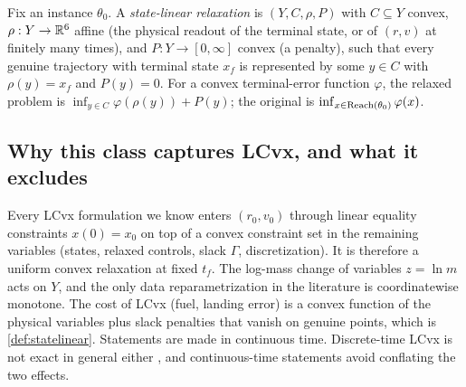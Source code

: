 \begin{definition}\label{def:statelinear}
Fix an instance $\theta_0$. A \emph{state-linear relaxation} is $(Y,C,\rho,P)$ with $C\subseteq Y$ convex,
$\rho:Y\to\mathbb{R}^6$ affine (the physical readout of the terminal state, or of $(r,v)$ at finitely many times), and
$P:Y\to[0,\infty]$ convex (a penalty), such that every genuine trajectory with terminal state $x_f$ is represented by
some $y\in C$ with $\rho(y)=x_f$ and $P(y)=0$. For a convex terminal-error function $\varphi$, the relaxed problem is
$\inf_{y\in C}\varphi(\rho(y))+P(y)$; the original is $\inf_{x\in\mathrm{Reach}(\theta_0)}\varphi(x)$.
\end{definition}

\subsection{Why this class captures LCvx, and what it excludes}\label{sec:scope}
Every LCvx formulation we know enters $(r_0,v_0)$ through linear equality constraints $x(0)=x_0$ on top of a convex
constraint set in the remaining variables (states, relaxed controls, slack $\Gamma$, discretization). It is therefore a
uniform convex relaxation at fixed $t_f$. The log-mass change of variables $z=\ln m$ \cite{acikmese2007jgcd} acts on
$Y$, and the only data reparametrization in the literature is coordinatewise monotone. The cost of LCvx (fuel, landing
error) is a convex function of the physical variables plus slack penalties that vanish on genuine points, which is
\cref{def:statelinear}. Statements are made in continuous time. Discrete-time LCvx is not exact in general either
\cite{luo2026automatica}, and continuous-time statements avoid conflating the two effects.

